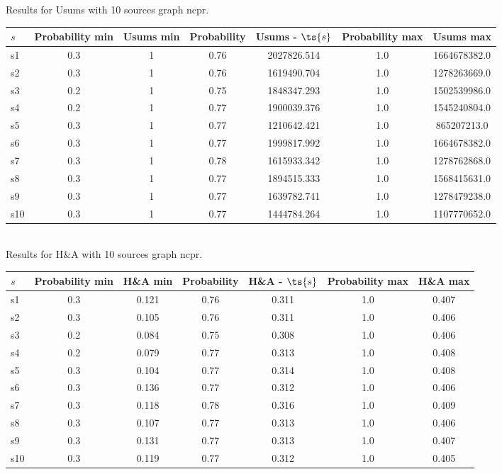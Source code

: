 \documentclass{article}
\begin{document}
\noindent Results for Usums with 10 sources graph ncpr.

\noindent\begin{tabular}{|l|c|c|c|c|c|c|}
\hline
$s$& Probability min & Usums min & Probability & Usums - $\ts{s}$ & Probability max & Usums max\\
\hline
s1 &0.3 & 1 & 0.76 & 2027826.514 & 1.0 & 1664678382.0\\
\hline
s2 &0.3 & 1 & 0.76 & 1619490.704 & 1.0 & 1278263669.0\\
\hline
s3 &0.2 & 1 & 0.75 & 1848347.293 & 1.0 & 1502539986.0\\
\hline
s4 &0.2 & 1 & 0.77 & 1900039.376 & 1.0 & 1545240804.0\\
\hline
s5 &0.3 & 1 & 0.77 & 1210642.421 & 1.0 & 865207213.0\\
\hline
s6 &0.3 & 1 & 0.77 & 1999817.992 & 1.0 & 1664678382.0\\
\hline
s7 &0.3 & 1 & 0.78 & 1615933.342 & 1.0 & 1278762868.0\\
\hline
s8 &0.3 & 1 & 0.77 & 1894515.333 & 1.0 & 1568415631.0\\
\hline
s9 &0.3 & 1 & 0.77 & 1639782.741 & 1.0 & 1278479238.0\\
\hline
s10 &0.3 & 1 & 0.77 & 1444784.264 & 1.0 & 1107770652.0\\
\hline
\end{tabular}\\

\noindent Results for H\&A with 10 sources graph ncpr.

\noindent\begin{tabular}{|l|c|c|c|c|c|c|}
\hline
$s$& Probability min & H\&A min & Probability & H\&A - $\ts{s}$ & Probability max & H\&A max\\
\hline
s1 &0.3 & 0.121 & 0.76 & 0.311 & 1.0 & 0.407\\
\hline
s2 &0.3 & 0.105 & 0.76 & 0.311 & 1.0 & 0.406\\
\hline
s3 &0.2 & 0.084 & 0.75 & 0.308 & 1.0 & 0.406\\
\hline
s4 &0.2 & 0.079 & 0.77 & 0.313 & 1.0 & 0.408\\
\hline
s5 &0.3 & 0.104 & 0.77 & 0.314 & 1.0 & 0.408\\
\hline
s6 &0.3 & 0.136 & 0.77 & 0.312 & 1.0 & 0.406\\
\hline
s7 &0.3 & 0.118 & 0.78 & 0.316 & 1.0 & 0.409\\
\hline
s8 &0.3 & 0.107 & 0.77 & 0.313 & 1.0 & 0.406\\
\hline
s9 &0.3 & 0.131 & 0.77 & 0.313 & 1.0 & 0.407\\
\hline
s10 &0.3 & 0.119 & 0.77 & 0.312 & 1.0 & 0.405\\
\hline
\end{tabular}\\
\end{document}
